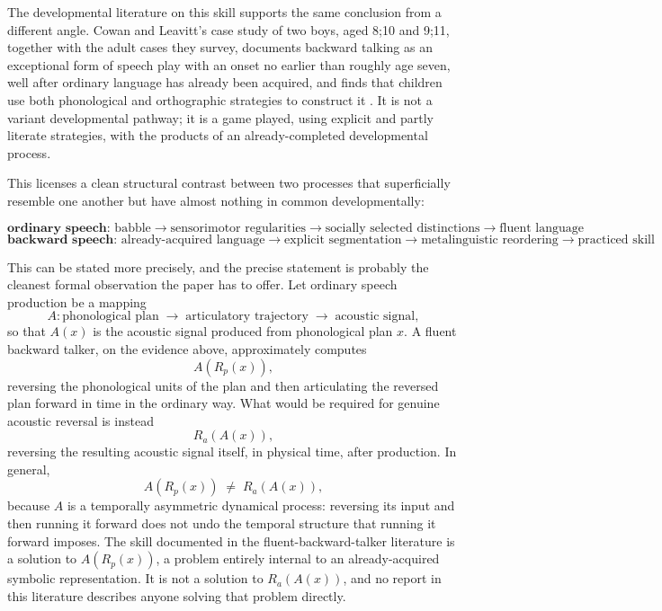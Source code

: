 \documentclass[11pt]{article}
\begin{document}
The developmental literature on this skill supports the same conclusion from a different angle. Cowan and Leavitt's case study of two boys, aged 8;10 and 9;11, together with the adult cases they survey, documents backward talking as an exceptional form of speech play with an onset no earlier than roughly age seven, well after ordinary language has already been acquired, and finds that children use both phonological and orthographic strategies to construct it \citep{cowan1982}. It is not a variant developmental pathway; it is a game played, using explicit and partly literate strategies, with the products of an already-completed developmental process.

This licenses a clean structural contrast between two processes that superficially resemble one another but have almost nothing in common developmentally:

\[
\textbf{ordinary speech: } \text{babble} \rightarrow \text{sensorimotor regularities} \rightarrow \text{socially selected distinctions} \rightarrow \text{fluent language}
\]
\[
\textbf{backward speech: } \text{already-acquired language} \rightarrow \text{explicit segmentation} \rightarrow \text{metalinguistic reordering} \rightarrow \text{practiced skill}
\]

This can be stated more precisely, and the precise statement is probably the cleanest formal observation the paper has to offer. Let ordinary speech production be a mapping
\[
A: \text{phonological plan} \;\rightarrow\; \text{articulatory trajectory} \;\rightarrow\; \text{acoustic signal},
\]
so that $A(x)$ is the acoustic signal produced from phonological plan $x$. A fluent backward talker, on the evidence above, approximately computes
\[
A(R_p(x)),
\]
reversing the phonological units of the plan and then articulating the reversed plan forward in time in the ordinary way. What would be required for genuine acoustic reversal is instead
\[
R_a(A(x)),
\]
reversing the resulting acoustic signal itself, in physical time, after production. In general,
\[
A(R_p(x)) \;\neq\; R_a(A(x)),
\]
because $A$ is a temporally asymmetric dynamical process: reversing its input and then running it forward does not undo the temporal structure that running it forward imposes. The skill documented in the fluent-backward-talker literature \citep{cowan1985} is a solution to $A(R_p(x))$, a problem entirely internal to an already-acquired symbolic representation. It is not a solution to $R_a(A(x))$, and no report in this literature describes anyone solving that problem directly.
\end{document}
